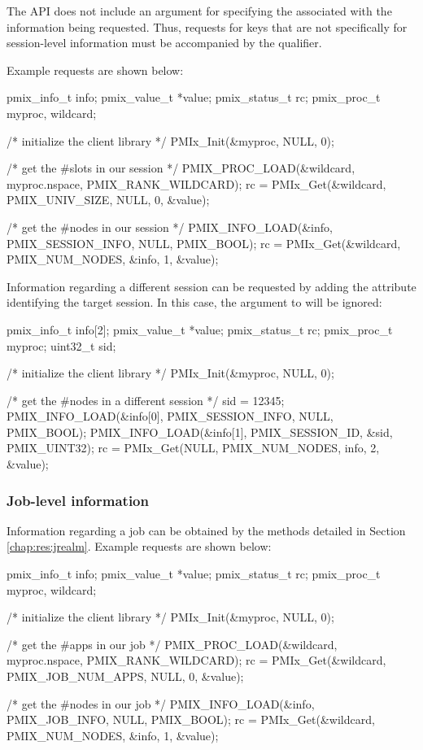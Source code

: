 The  \ac{API} does not include an argument for specifying the  associated with the information being requested. Thus, requests for keys that are not specifically for session-level information must be accompanied by the  qualifier.

Example requests are shown below:

\cspecificstart
\begin{codepar}
pmix_info_t info;
pmix_value_t *value;
pmix_status_t rc;
pmix_proc_t myproc, wildcard;

/* initialize the client library */
PMIx_Init(&myproc, NULL, 0);

/* get the #slots in our session */
PMIX_PROC_LOAD(&wildcard, myproc.nspace, PMIX_RANK_WILDCARD);
rc = PMIx_Get(&wildcard, PMIX_UNIV_SIZE, NULL, 0, &value);

/* get the #nodes in our session */
PMIX_INFO_LOAD(&info, PMIX_SESSION_INFO, NULL, PMIX_BOOL);
rc = PMIx_Get(&wildcard, PMIX_NUM_NODES, &info, 1, &value);
\end{codepar}
\cspecificend

Information regarding a different session can be requested by adding the  attribute identifying the target session. In this case, the  argument to  will be ignored:

\cspecificstart
\begin{codepar}
pmix_info_t info[2];
pmix_value_t *value;
pmix_status_t rc;
pmix_proc_t myproc;
uint32_t sid;

/* initialize the client library */
PMIx_Init(&myproc, NULL, 0);

/* get the #nodes in a different session */
sid = 12345;
PMIX_INFO_LOAD(&info[0], PMIX_SESSION_INFO, NULL, PMIX_BOOL);
PMIX_INFO_LOAD(&info[1], PMIX_SESSION_ID, &sid, PMIX_UINT32);
rc = PMIx_Get(NULL, PMIX_NUM_NODES, info, 2, &value);
\end{codepar}
\cspecificend

\subsubsection{Job-level information}

Information regarding a job can be obtained by the methods detailed in Section \ref{chap:res:jrealm}. Example requests are shown below:

\cspecificstart
\begin{codepar}
pmix_info_t info;
pmix_value_t *value;
pmix_status_t rc;
pmix_proc_t myproc, wildcard;

/* initialize the client library */
PMIx_Init(&myproc, NULL, 0);

/* get the #apps in our job */
PMIX_PROC_LOAD(&wildcard, myproc.nspace, PMIX_RANK_WILDCARD);
rc = PMIx_Get(&wildcard, PMIX_JOB_NUM_APPS, NULL, 0, &value);

/* get the #nodes in our job */
PMIX_INFO_LOAD(&info, PMIX_JOB_INFO, NULL, PMIX_BOOL);
rc = PMIx_Get(&wildcard, PMIX_NUM_NODES, &info, 1, &value);
\end{codepar}
\cspecificend


